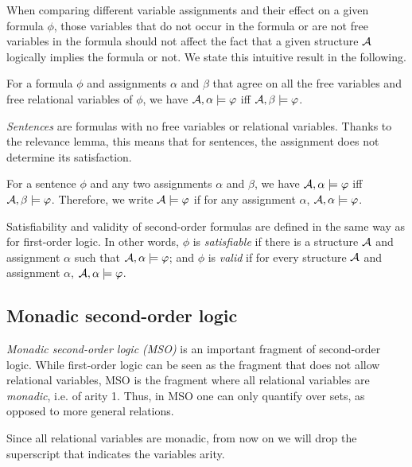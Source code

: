 \documentclass[11pt,twoside=off,numbers=noenddot]{scrbook}
\begin{document}
When comparing different variable assignments and their effect on a given formula $\phi$, those variables that do not occur in the formula or are not free variables in the formula should not affect the fact that a given structure $\mathcal{A}$ logically implies the formula or not. We state this intuitive result in the following.

\begin{lemma}
  For a formula $\phi$ and assignments $\alpha$ and $\beta$ that agree on all the free variables and free relational variables of $\phi$, we have $\mathcal{A}, \alpha \models \varphi$ iff $\mathcal{A}, \beta \models \varphi$.
\end{lemma}

\emph{Sentences} are formulas with no free variables or relational variables. Thanks to the relevance lemma, this means that for sentences, the assignment does not determine its satisfaction.

\begin{proposition}
  For a sentence $\phi$ and any two assignments $\alpha$ and $\beta$, we have $\mathcal{A}, \alpha \models \varphi$ iff $\mathcal{A}, \beta \models \varphi$. Therefore, we write $\mathcal{A} \models \varphi$ if for any assignment $\alpha$, $\mathcal{A}, \alpha \models \varphi$.
\end{proposition}

Satisfiability and validity of second-order formulas are defined in the same way as for first-order logic. In other words, $\phi$ is \emph{satisfiable} if there is a structure $\mathcal{A}$ and assignment $\alpha$ such that $\mathcal{A}, \alpha \models \varphi$; and $\phi$ is \emph{valid} if for every structure $\mathcal{A}$ and assignment $\alpha$, $\mathcal{A}, \alpha \models \varphi$.

\subsection{Monadic second-order logic}
\emph{Monadic second-order logic (MSO)} is an important fragment of second-order logic. While first-order logic can be seen as the fragment that does not allow relational variables, MSO is the fragment where all relational variables are \emph{monadic}, i.e. of arity 1. Thus, in MSO one can only quantify over sets, as opposed to more general relations.

\begin{abuse}
  Since all relational variables are monadic, from now on we will drop the superscript that indicates the variables arity.
\end{abuse}
\end{document}
